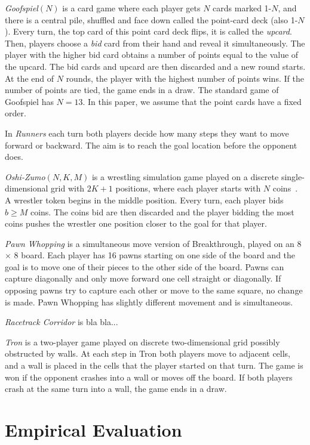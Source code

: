 \documentclass[conference]{IEEEtran}
\begin{document}
\textit{Goofspiel}$(N)$ is a card game where each player gets $N$ cards marked 1-$N$, and there is a central pile, 
shuffled and face down called the point-card deck (also 1-$N$). Every turn, the top card of this point card deck flips, 
it is called the {\it upcard}. Then, players choose a {\it bid} card from their hand and reveal it simultaneously. 
The player with the higher bid card obtains a number of points equal to the value of the upcard. The bid cards and 
upcard are then discarded and a new round starts. At the end of $N$ rounds, the player with the highest number of 
points wins. If the number of points are tied, the game ends in a draw. The standard game of Goofspiel has 
$N = 13$. In this paper, we assume that the point cards have a fixed order. 

In \textit{Runners} each turn both players decide how many steps they want to move forward or backward. The aim 
is to reach the goal location before the opponent does.

\textit{Oshi-Zumo}$(N,K,M)$ is a wrestling simulation game played on a discrete single-dimensional grid with 
$2K+1$ positions, where each player starts with $N$ coins~\cite{Buro03OshiZumo}. A wrestler token begins in the middle 
position. Every turn, 
each player bids $b \ge M$ coins. The coins bid are then discarded and the player bidding the most coins pushes the 
wrestler one position closer to the goal for that player. 

\textit{Pawn Whopping} is a simultaneous move version of Breakthrough, played on an 8 $\times$ 8 board. Each player has 
16 pawns starting on one side of the board and the goal is to move one of their pieces to the other side of the board. 
Pawns can capture diagonally and only move forward one cell straight or diagonally.
If opposing pawns try to capture each other or move to the same square, no change is made. 
Pawn Whopping has slightly different movement and is simultaneous.

\textit{Racetrack Corridor} is bla bla...

\textit{Tron} is a two-player game played on discrete two-dimensional grid possibly obstructed by walls. At each
step in Tron both players move to adjacent cells, and a wall is placed in the cells that the player started on that turn. 
The game is won if the opponent crashes into a wall or moves off the board. If both players crash at the same turn 
into a wall, the game ends in a draw.

\section{Empirical Evaluation}
\label{sec:exp}
\end{document}
